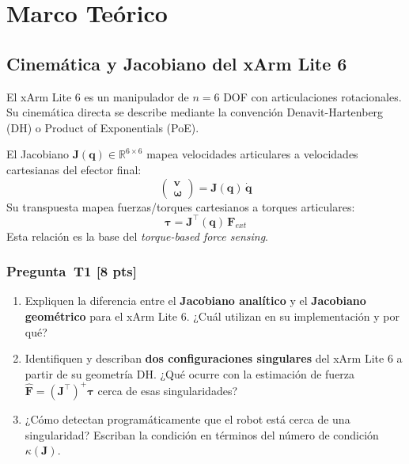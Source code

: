 \documentclass[journal,10pt,twoside]{IEEEtran}
\newcommand{\pts}[1]{\textcolor{tec_red}{\textbf{[#1 pts]}}}
\begin{document}
\section{Marco Teórico}
\label{sec:background}

\subsection{Cinemática y Jacobiano del xArm Lite 6}

El xArm Lite 6 es un manipulador de $n=6$ DOF con articulaciones
rotacionales. Su cinemática directa se describe mediante la convención
Denavit-Hartenberg (DH) o Product of Exponentials (PoE).

\begin{theorybox}
  El Jacobiano $\bm{J}(\bm{q}) \in \mathbb{R}^{6\times6}$ mapea
  velocidades articulares a velocidades cartesianas del efector final:
  \[
    \begin{pmatrix} \bm{v} \\ \bm{\omega} \end{pmatrix} = \bm{J}(\bm{q})\,\dot{\bm{q}}
  \]
  Su transpuesta mapea fuerzas/torques cartesianos a torques articulares:
  \[
    \bm{\tau} = \bm{J}^\top(\bm{q})\,\bm{F}_{ext}
  \]
  Esta relación es la base del \emph{torque-based force sensing}.
\end{theorybox}

\subsubsection*{Pregunta~T1 \pts{8}}
\begin{enumerate}[label=(\alph*)]
  \item Expliquen la diferencia entre el \textbf{Jacobiano analítico}
        y el \textbf{Jacobiano geométrico} para el xArm Lite 6.
        ¿Cuál utilizan en su implementación y por qué?
  \item Identifiquen y describan \textbf{dos configuraciones singulares}
        del xArm Lite 6 a partir de su geometría DH. ¿Qué ocurre con la
        estimación de fuerza $\hat{\bm{F}} = (\bm{J}^\top)^+\bm{\tau}$
        cerca de esas singularidades?
  \item ¿Cómo detectan programáticamente que el robot está cerca de
        una singularidad? Escriban la condición en términos del
        número de condición $\kappa(\bm{J})$.
\end{enumerate}
\end{document}

